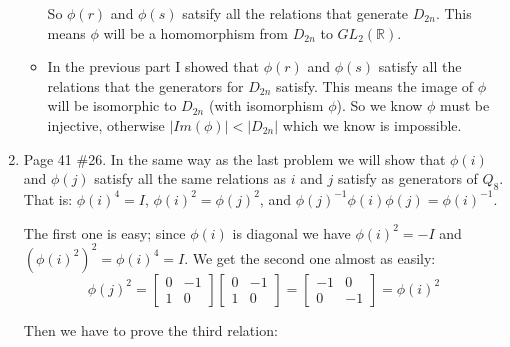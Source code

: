 \documentclass[12pt]{report}
\begin{document}
\begin{enumerate}
\begin{itemize}
      So $\phi(r)$ and $\phi(s)$ satsify all the relations that generate
      $D_{2n}$. This means $\phi$ will be a homomorphism from $D_{2n}$ to
      $GL_2(\mathbb{R})$.

  \item In the previous part I showed that $\phi(r)$ and $\phi(s)$ satisfy all
  the relations that the generators for $D_{2n}$ satisfy. This means the
  image of $\phi$ will be isomorphic to $D_{2n}$ (with isomorphism $\phi$).
  So we know $\phi$ must be injective, otherwise $ |Im(\phi)| < |D_{2n}|$ which
  we know is impossible.

  \end{itemize}

\item Page 41 \#26. In the same way as the last problem we will show that
      $\phi(i)$ and $\phi(j)$ satisfy all the same relations as $i$ and $j$
      satisfy as generators of $Q_8$. That is: $\phi(i)^4 = I$,
      $\phi(i)^2 = \phi(j)^2$, and $\phi(j)^{-1}\phi(i)\phi(j)=\phi(i)^{-1}$.

      The first one is easy; since $\phi(i)$ is diagonal we have $\phi(i)^2 =
      -I$ and $(\phi(i)^2)^2 = \phi(i)^4 = I$. We get the second one almost as
      easily:
      $$
      \phi(j)^2=
      \begin{bmatrix}
        0 & -1\\
        1 & 0
      \end{bmatrix}
      \begin{bmatrix}
        0 & -1\\
        1 & 0
      \end{bmatrix}
      =
      \begin{bmatrix}
        -1 & 0\\
        0 & -1
      \end{bmatrix}
      =\phi(i)^2
      $$

      Then we have to prove the third relation:


\end{enumerate}
\end{document}
